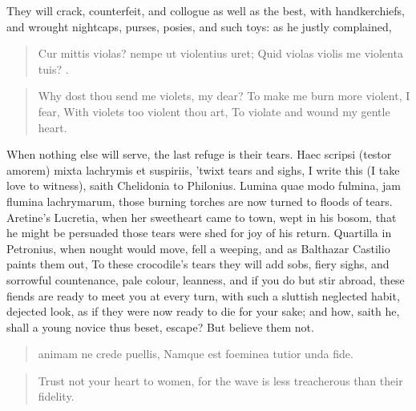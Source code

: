 They will crack, counterfeit, and collogue as well as the best,
with handkerchiefs, and wrought nightcaps, purses, posies, and such
toys: as he justly complained,

\begin{latin}
\begin{verse}
Cur mittis violas? nempe ut violentius uret;
Quid violas violis me violenta tuis? \etc{}.
\end{verse}
\end{latin}
\translationrule%
\begin{verse}%
Why dost thou send me violets, my dear?
To make me burn more violent, I fear,
With violets too violent thou art,
To violate and wound my gentle heart.
\end{verse}%

When nothing else will serve, the last refuge is their tears. Haec
scripsi (testor amorem) mixta lachrymis et suspiriis, 'twixt tears and
sighs, I write this (I take love to witness), saith Chelidonia to
Philonius. Lumina quae modo fulmina, jam flumina lachrymarum, those
burning torches are now turned to floods of tears. Aretine's Lucretia,
when her sweetheart came to town, wept in his bosom, that he
might be persuaded those tears were shed for joy of his return.
Quartilla in Petronius, when nought would move, fell a weeping, and as
Balthazar Castilio paints them out, To these crocodile's tears
they will add sobs, fiery sighs, and sorrowful countenance, pale
colour, leanness, and if you do but stir abroad, these fiends are ready
to meet you at every turn, with such a sluttish neglected habit,
dejected look, as if they were now ready to die for your sake; and how,
saith he, shall a young novice thus beset, escape? But believe them
not.

\begin{latin}
\begin{verse}
animam ne crede puellis,
Namque est foeminea tutior unda fide.
\end{verse}
\end{latin}
\translationrule%
\begin{verse}%
Trust not your heart to women,
for the wave is less treacherous than their fidelity.
\end{verse}%

